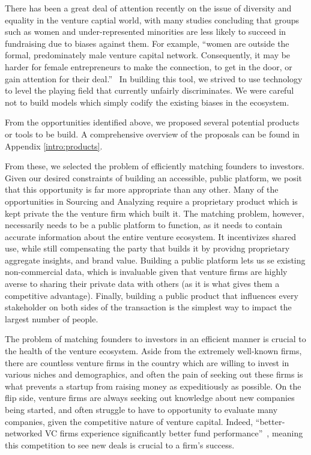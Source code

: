 There has been a great deal of attention recently on the issue of diversity and equality in the venture captial world, with many studies concluding that groups such as women and under-represented minorities are less likely to succeed in fundraising due to biases against them. For example, ``women are outside the formal, predominately male venture capital network. Consequently, it may be harder for female entrepreneurs to make the connection, to get in the door, or gain attention for their deal.''~\cite{doi:10.1080/13691060118175} In building this tool, we strived to use technology to level the playing field that currently unfairly discriminates. We were careful not to build models which simply codify the existing biases in the ecosystem.

From the opportunities identified above, we proposed several potential products or tools to be build. A comprehensive overview of the proposals can be found in Appendix \ref{intro:products}.

From these, we selected the problem of efficiently matching founders to investors. Given our desired constraints of building an accessible, public platform, we posit that this opportunity is far more appropriate than any other. Many of the opportunities in Sourcing and Analyzing require a proprietary product which is kept private the the venture firm which built it. The matching problem, however, necessarily needs to be a public platform to function, as it needs to contain accurate information about the entire venture ecosystem. It incentivizes shared use, while still compensating the party that builds it by providng proprietary aggregate insights, and brand value. Building a public platform lets us se existing non-commercial data, which is invaluable given that venture firms are highly averse to sharing their private data with others (as it is what gives them a competitive advantage). Finally, building a public product that influences every stakeholder on both sides of the transaction is the simplest way to impact the largest number of people.

The problem of matching founders to investors in an efficient manner is crucial to the health of the venture ecosystem. Aside from the extremely well-known firms, there are countless venture firms in the country which are willing to invest in various niches and demographics, and often the pain of seeking out these firms is what prevents a startup from raising money as expeditiously as possible. On the flip side, venture firms are always seeking out knowledge about new companies being started, and often struggle to have to opportunity to evaluate many companies, given the competitive nature of venture capital. Indeed, ``better‐networked VC firms experience significantly better fund performance''~\cite{doi:10.1111/j.1540-6261.2007.01207.x}, meaning this competition to see new deals is crucial to a firm's success.

